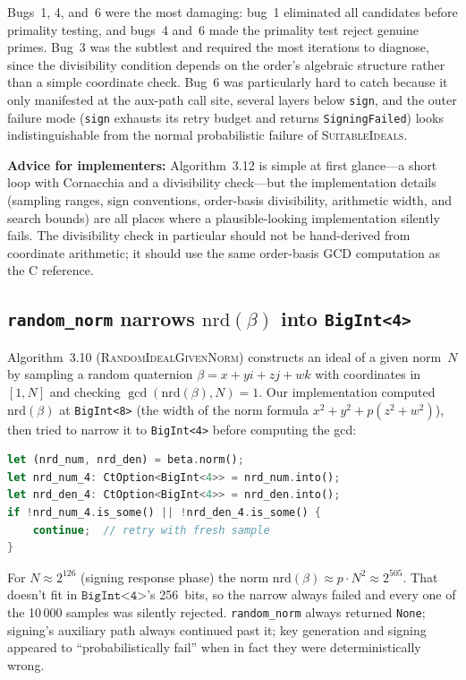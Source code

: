 Bugs~1, 4, and~6 were the most damaging: bug~1 eliminated all
candidates before primality testing, and bugs~4 and~6 made the
primality test reject genuine primes.  Bug~3 was the subtlest and
required the most iterations to diagnose, since the divisibility
condition depends on the order's algebraic structure rather than a
simple coordinate check.  Bug~6 was particularly hard to catch
because it only manifested at the aux-path call site, several
layers below \texttt{sign}, and the outer failure mode
(\texttt{sign} exhausts its retry budget and returns
\texttt{SigningFailed}) looks indistinguishable from the normal
probabilistic failure of \textsc{SuitableIdeals}.

\noindent
\textbf{Advice for implementers:} Algorithm~3.12 is simple at first glance---a short
loop with Cornacchia and a divisibility check---but the implementation
details (sampling ranges, sign conventions, order-basis divisibility,
arithmetic width, and search bounds) are all places where a
plausible-looking implementation silently fails.  The divisibility
check in particular should not be hand-derived from coordinate
arithmetic; it should use the same order-basis GCD computation as the
C reference.

\subsection{\texttt{random\_norm} narrows $\mathrm{nrd}(\beta)$ into
  \texttt{BigInt<4>}}
\label{sec:bug-random-norm-narrow}

Algorithm~3.10 (\textsc{RandomIdealGivenNorm}) constructs an ideal
of a given norm~$N$ by sampling a random quaternion
$\beta = x + yi + zj + wk$ with coordinates in $[1, N]$ and checking
$\gcd(\mathrm{nrd}(\beta), N) = 1$.  Our implementation computed
$\mathrm{nrd}(\beta)$ at \texttt{BigInt<8>} (the width of the norm
formula $x^2 + y^2 + p(z^2 + w^2)$), then tried to narrow it to
\texttt{BigInt<4>} before computing the gcd:
\begin{lstlisting}[language=Rust]
let (nrd_num, nrd_den) = beta.norm();
let nrd_num_4: CtOption<BigInt<4>> = nrd_num.into();
let nrd_den_4: CtOption<BigInt<4>> = nrd_den.into();
if !nrd_num_4.is_some() || !nrd_den_4.is_some() {
    continue;  // retry with fresh sample
}
\end{lstlisting}
For $N \approx 2^{126}$ (signing response phase) the norm
$\mathrm{nrd}(\beta) \approx p \cdot N^2 \approx 2^{505}$.  That
doesn't fit in $\texttt{BigInt<4>}$'s 256~bits, so the narrow always
failed and every one of the 10\,000 samples was silently rejected.
\texttt{random\_norm} always returned \texttt{None}; signing's
auxiliary path always continued past it; key generation and
signing appeared to ``probabilistically fail'' when in fact they
were deterministically wrong.

